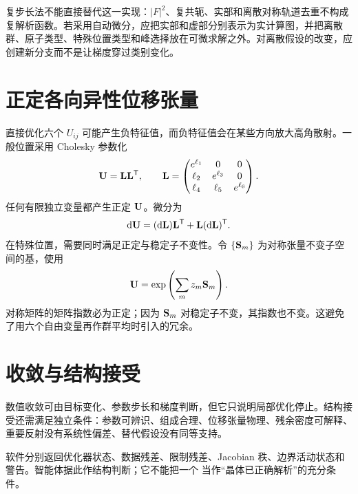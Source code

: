 复步长法不能直接替代这一实现：$|F|^2$、复共轭、实部和离散对称轨道去重不构成复解析函数。若采用自动微分，应把实部和虚部分别表示为实计算图，并把离散群、原子类型、特殊位置类型和峰选择放在可微求解之外。对离散假设的改变，应创建新分支而不是让梯度穿过类别变化。

\section{正定各向异性位移张量}
直接优化六个 $U_{ij}$ 可能产生负特征值，而负特征值会在某些方向放大高角散射。一般位置采用 Cholesky 参数化
\begin{equation}
\mathbf{U}=\mathbf{L}\mathbf{L}^{\mathsf T},\qquad
\mathbf{L}=\begin{pmatrix}
e^{\ell_1}&0&0\\
\ell_2&e^{\ell_3}&0\\
\ell_4&\ell_5&e^{\ell_6}
\end{pmatrix}.
\end{equation}
任何有限独立变量都产生正定 $\mathbf{U}$。微分为
\begin{equation}
\mathrm{d}\mathbf{U}=(\mathrm{d}\mathbf{L})\mathbf{L}^{\mathsf T}+\mathbf{L}(\mathrm{d}\mathbf{L})^{\mathsf T}.
\end{equation}
在特殊位置，需要同时满足正定与稳定子不变性。令 $\{\mathbf{S}_m\}$ 为对称张量不变子空间的基，使用
\begin{equation}
\mathbf{U}=\exp\left(\sum_m z_m\mathbf{S}_m\right).
\end{equation}
对称矩阵的矩阵指数必为正定；因为 $\mathbf{S}_m$ 对稳定子不变，其指数也不变。这避免了用六个自由变量再作群平均时引入的冗余。

\section{收敛与结构接受}
数值收敛可由目标变化、参数步长和梯度判断，但它只说明局部优化停止。结构接受还需满足独立条件：参数可辨识、组成合理、位移张量物理、残余密度可解释、重要反射没有系统性偏差、替代假设没有同等支持。

软件分别返回优化器状态、数据残差、限制残差、Jacobian 秩、边界活动状态和警告。智能体据此作结构判断；它不能把一个  当作“晶体已正确解析”的充分条件。
